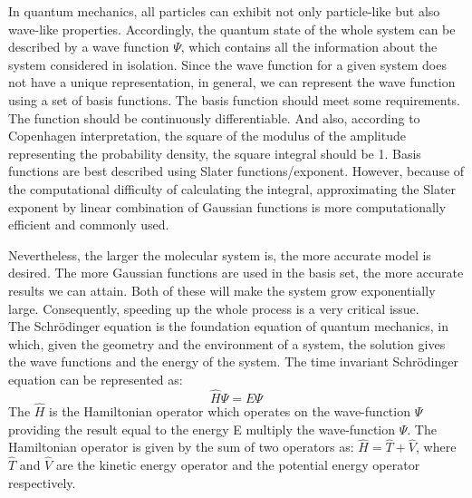 \documentclass[twoside]{article}
\begin{document}
In quantum mechanics, all particles can exhibit not only particle-like but also wave-like properties. Accordingly, the quantum state of the whole system can be described by a wave function $\Psi$, which contains all the information about the system considered in isolation. Since the wave function for a given system does not have a unique representation, in general, we can represent the wave function using a set of basis functions. The basis function should meet some requirements.  The function should be continuously differentiable. And also, according to Copenhagen interpretation, the square of the modulus of the amplitude representing the probability density, the square integral should be 1. Basis functions are best described using Slater functions/exponent. However, because of the computational difficulty of calculating the integral, approximating the Slater exponent by linear combination of Gaussian functions is more computationally efficient and commonly used. 

Nevertheless, the larger the molecular system is, the more accurate model is desired. The more Gaussian functions are used in the basis set, the more accurate results we can attain. Both of these will make the system grow exponentially large. Consequently, speeding up the whole process is a very critical issue. \\






The Schr\"{o}dinger equation is the foundation equation of quantum mechanics, in which, given the geometry and the environment of a system, the solution gives the wave functions and the energy of the system. 
The time invariant Schr\"{o}dinger equation can be represented as:
\[
				\hat{H}\Psi = E\Psi
\]
The $\hat{H}$ is the Hamiltonian operator which operates on the wave-function $\Psi$ providing the result equal to the energy E multiply the wave-function $\Psi$. The Hamiltonian operator is given by the sum of two operators as: $\hat{H} = \hat{T} + \hat{V}$,  where $\hat{T}$ and $\hat{V}$ are the kinetic energy operator and the potential energy operator respectively.
\end{document}
